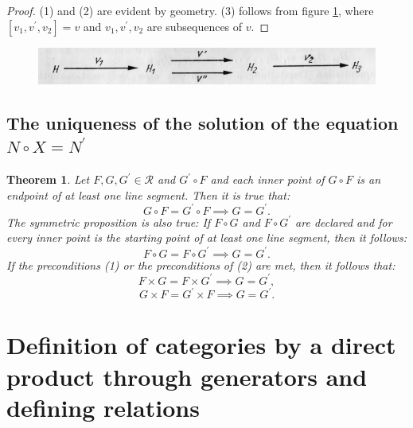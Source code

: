 \documentclass{article}
\newtheorem{theorem}{Theorem}
\begin{document}
\begin{proof}
  (1) and (2) are evident by geometry. (3) follows from figure \ref{fig:figure12}, where $[v_1, v^{\prime}, v_2] = v$ and $v_1, v^{\prime}, v_2$ are subsequences of $v$.
\end{proof}

\begin{figure}
\includegraphics[]{figure12.png}
\caption{}
\label{fig:figure12}
\end{figure}

\subsection{The uniqueness of the solution of the equation $N\circ X= N^{\prime}$}

\begin{theorem}
  Let $F, G, G^{\prime} \in \mathcal{R}$ and $G^{\prime} \circ F$ and each inner point of $G \circ F$ is an endpoint of at least one line segment. Then it is true that:
  \begin{equation} G \circ F = G^{\prime} \circ F \implies G = G^{\prime}. \label{eq:th51} \end{equation}
  The symmetric proposition is also true: If $F \circ G$ and $F \circ G^{\prime}$ are declared and for every inner point is the starting point of at least one line segment, then it follows:
  \begin{equation} F \circ G = F \circ G^{\prime} \implies G = G^{\prime}. \label{eq:th51} \end{equation}
  If the preconditions (1) or the preconditions of (2) are met, then it follows that:
  \begin{equation} F \times G = F \times G^{\prime} \implies G = G^{\prime}, \label{eq:th53} \end{equation}
  \begin{equation} G \times F = G^{\prime} \times F \implies G = G^{\prime}. \label{eq:th54} \end{equation}
\end{theorem}



\section{Definition of categories by a direct product through generators and defining relations}
\end{document}
